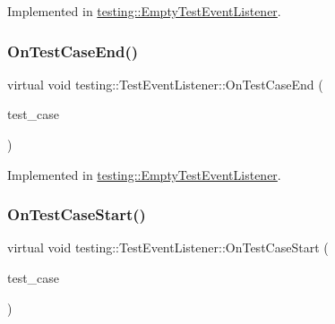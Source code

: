 Implemented in \mbox{\hyperlink{classtesting_1_1_empty_test_event_listener_a00fa1a4ea5831e20746188414268e7c6}{testing\+::\+Empty\+Test\+Event\+Listener}}.

\mbox{\label{classtesting_1_1_test_event_listener_ae61985e2ef76ac78379b077be57a9c36}} 
\subsubsection{\texorpdfstring{OnTestCaseEnd()}{OnTestCaseEnd()}}
{\footnotesize\ttfamily virtual void testing\+::\+Test\+Event\+Listener\+::\+On\+Test\+Case\+End (\begin{DoxyParamCaption}\item[{const \mbox{\hyperlink{classtesting_1_1_test_case}{Test\+Case}} \&}]{test\+\_\+case }\end{DoxyParamCaption})\hspace{0.3cm}{\ttfamily [pure virtual]}}



Implemented in \mbox{\hyperlink{classtesting_1_1_empty_test_event_listener_a6bec703158283104c4298f7d8a528515}{testing\+::\+Empty\+Test\+Event\+Listener}}.

\mbox{\label{classtesting_1_1_test_event_listener_ab4ed885d63f5bbff8076c1329b3dfe36}} 
\subsubsection{\texorpdfstring{OnTestCaseStart()}{OnTestCaseStart()}}
{\footnotesize\ttfamily virtual void testing\+::\+Test\+Event\+Listener\+::\+On\+Test\+Case\+Start (\begin{DoxyParamCaption}\item[{const \mbox{\hyperlink{classtesting_1_1_test_case}{Test\+Case}} \&}]{test\+\_\+case }\end{DoxyParamCaption})\hspace{0.3cm}{\ttfamily [pure virtual]}}



